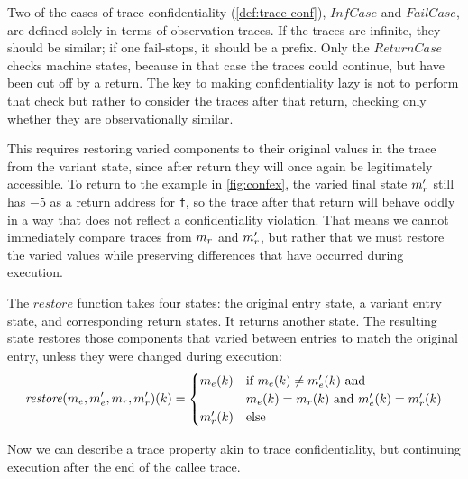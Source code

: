 \documentclass[acmsmall,review,anonymous]{acmart}\settopmatter{printfolios=true,printccs=false,printacmref=false}
\begin{document}
      Two of the cases of trace confidentiality (\cref{def:trace-conf}), \(\mathit{InfCase}\)
      and \(\mathit{FailCase}\), are defined solely in terms of
      observation traces. If
      the traces are infinite, they should be similar; if one
      fail-stops, it should be a prefix. Only the
      \(\mathit{ReturnCase}\) checks machine states, because in that
      case the traces could continue, but have been cut off by a
      return. The key to making confidentiality lazy is not to perform that
      check but rather to consider the traces after that return,
      checking only whether they are observationally similar.

      This requires restoring varied components to their original
      values in the trace from the variant state, since after return
      they will once again be legitimately accessible. To return to
      the example in \cref{fig:confex}, the varied final state
      \(m_r'\) still has $-5$ as a return address for {\tt f}, so
      the trace after that return will behave oddly in a way that
      does not reflect a confidentiality violation.  That means we
      cannot immediately compare traces from \(m_r\) and
      \(m_r'\), but rather that we must restore the varied values
      while preserving differences that have occurred during
      execution.


      The \(\mathit{restore}\) function takes four states: the
      original entry state, a variant entry state, and corresponding return
      states. It returns another state. The resulting state restores those
      components that varied between entries to match the original entry,
      unless they were changed during execution:
      \[\mathit{restore}(m_e,m_e',m_r,m_r')
        (k) =
        \begin{cases}
          m_e(k) & \text{if } m_e(k) \not =
                                m_e'(k) \text { and } \\
          & m_e(k) = m_r(k) \text{ and }
            m_e'(k) = m_r'(k) \\
          m_r'(k) & \text{else} \\
        \end{cases}\]

      Now we can describe a trace property akin to trace confidentiality, but
      continuing execution after the end of the callee trace.
\end{document}

